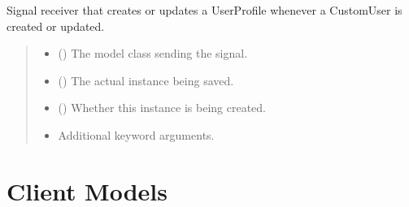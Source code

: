 \documentclass[letterpaper,10pt,english]{sphinxmanual}
\begin{document}
\begin{fulllineitems}
\label{\detokenize{modules/models:account.models.create_or_update_user_profile}}
\pysigstartsignatures
{}
\pysigstopsignatures
\sphinxAtStartPar
Signal receiver that creates or updates a UserProfile whenever a CustomUser is created or updated.
\begin{quote}\begin{description}
\begin{itemize}
\item {} 
\sphinxAtStartPar
{} () \textendash{} The model class sending the signal.

\item {} 
\sphinxAtStartPar
{} ({\hyperref[\detokenize{modules/models:account.models.CustomUser}]{}}) \textendash{} The actual instance being saved.

\item {} 
\sphinxAtStartPar
{} () \textendash{} Whether this instance is being created.

\item {} 
\sphinxAtStartPar
{} \textendash{} Additional keyword arguments.

\end{itemize}

\end{description}\end{quote}

\end{fulllineitems}



\section{Client Models}
\label{\detokenize{modules/models:module-client.models}}\label{\detokenize{modules/models:client-models}}
\end{document}
